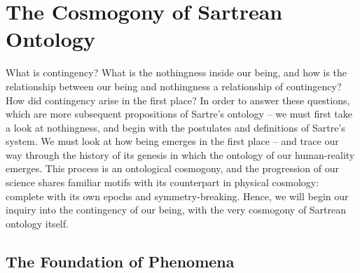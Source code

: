 \chapter{The Cosmogony of Sartrean Ontology}


What is contingency? What is the nothingness inside our being, and how is the relationship between our being and nothingness a relationship of contingency? How did contingency arise in the first place? In order to answer these questions, which are more subsequent propositions of Sartre's ontology -- we must first take a look at nothingness, and begin with the postulates and definitions of Sartre's system. We must look at how being emerges in the first place -- and trace our way through the history of its genesis in which the ontology of our human-reality emerges. This process is an ontological cosmogony, and the progression of our science shares familiar motifs with its counterpart in physical cosmology: complete with its own epochs and symmetry-breaking. Hence, we will begin our inquiry into the contingency of our being, with the very cosmogony of Sartrean ontology itself.

\section{The Foundation of Phenomena}

